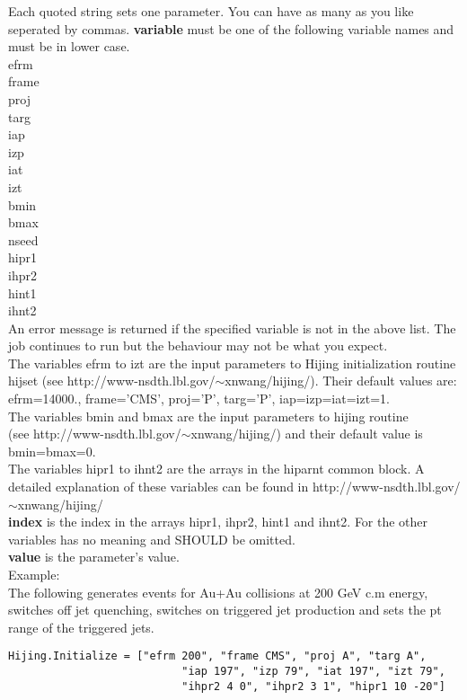 \documentclass[11pt]{article}
\begin{document}
Each quoted string sets one parameter. You can have as many as you like
seperated by commas. 
{\bf variable} must be one of the following variable names and
must be in lower case.\\
efrm\\
frame\\
proj\\
targ\\
iap\\
izp\\
iat\\
izt\\
bmin\\
bmax\\
nseed\\
hipr1\\
ihpr2\\
hint1\\
ihnt2\\
An error message is returned if the specified variable is not in the above list. The job continues
to run but the behaviour may not be what you expect.\\
The variables efrm to izt are the input parameters to Hijing initialization routine hijset
(see http://www-nsdth.lbl.gov/$\sim$xnwang/hijing/). Their default values are:
efrm=14000., frame='CMS', proj='P', targ='P', iap=izp=iat=izt=1.\\
The variables bmin and bmax are the input parameters to hijing routine\\
(see http://www-nsdth.lbl.gov/$\sim$xnwang/hijing/)
and their default
value is bmin=bmax=0.\\
The variables hipr1 to ihnt2 are the arrays in the hiparnt common block. A detailed explanation
of these variables can be found in http://www-nsdth.lbl.gov/$\sim$xnwang/hijing/ \\

{\bf index} is the index in the arrays hipr1, ihpr2, hint1 and ihnt2. For the other variables
has no meaning and SHOULD be omitted.\\

{\bf value} is the parameter's value.\\

Example:\\
The following generates events for Au+Au collisions at 200 GeV c.m energy, switches off jet quenching,
switches on triggered jet production and sets the pt range of the triggered jets.
\begin{verbatim}Hijing.Initialize = ["efrm 200", "frame CMS", "proj A", "targ A", 
                           "iap 197", "izp 79", "iat 197", "izt 79",
                           "ihpr2 4 0", "ihpr2 3 1", "hipr1 10 -20"]
\end{verbatim} 
\end{document}
